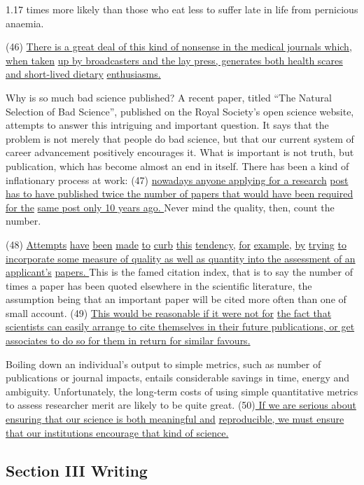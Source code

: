 \documentclass[UTF8,11pt]{ctexart}
\begin{document}
1.17 times more likely than those who eat less to suffer late in life from pernicious anaemia.


(46) \uline{There is a great deal of this kind of nonsense in the medical journals which, when taken} \uline{up by broadcasters and the lay press, generates both health scares and short-lived dietary} \uline{enthusiasms.}


Why is so much bad science published? A recent paper, titled “The Natural Selection of Bad Science”, published on the Royal Society’s open science website, attempts to answer this intriguing and important question. It says that the problem is not merely that people do bad science, but that our current system of career advancement positively encourages it. What is important is not truth, but publication, which has become almost an end in itself. There has been a kind of inflationary process at work: (47) \uline{nowadays anyone applying for a research} \uline{post has to have published twice the number of papers that would have been required for the} \uline{same post only 10 years ago. }Never mind the quality, then, count the number.


(48) \uline{Attempts} \uline{have} \uline{been} \uline{made} \uline{to} \uline{curb} \uline{this} \uline{tendency,} \uline{for} \uline{example,} \uline{by} \uline{trying} \uline{to} \uline{incorporate some measure of quality as well as quantity into the assessment of an applicant’s} \uline{papers. }This is the famed citation index, that is to say the number of times a paper has been quoted elsewhere in the scientific literature, the assumption being that an important paper will be cited more often than one of small account. (49) \uline{This would be reasonable if it were not for} \uline{the fact that scientists can easily arrange to cite themselves in their future publications, or get} \uline{associates to do so for them in return for similar favours.}


Boiling down an individual’s output to simple metrics, such as number of publications or journal impacts, entails considerable savings in time, energy and ambiguity. Unfortunately, the long-term costs of using simple quantitative metrics to assess researcher merit are likely to be quite great. (50)\uline{ If we are serious about ensuring that our science is both meaningful and} \uline{reproducible, we must ensure that our institutions encourage that kind of science.}


\subsection*{\textbf{Section III Writing}}
\end{document}
